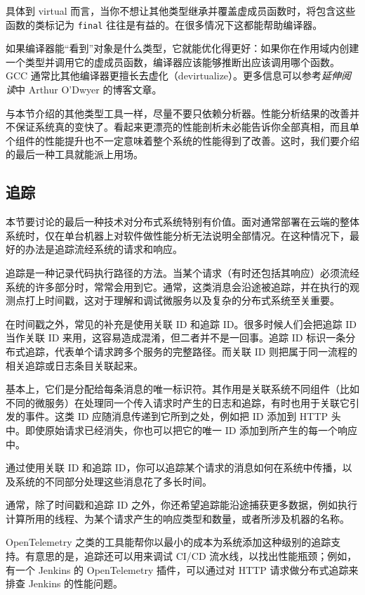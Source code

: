 具体到 virtual 而言，当你不想让其他类型继承并覆盖虚成员函数时，将包含这些函数的类标记为 \texttt{final} 往往是有益的。在很多情况下这都能帮助编译器。

\label{idx:1209}
如果编译器能“看到”对象是什么类型，它就能优化得更好：如果你在作用域内创建一个类型并调用它的虚成员函数，编译器应该能够推断出应该调用哪个函数。GCC 通常比其他编译器更擅长去虚化（devirtualize）。更多信息可以参考\emph{延伸阅读}中 Arthur O'Dwyer 的博客文章。

与本节介绍的其他类型工具一样，尽量不要只依赖分析器。性能分析结果的改善并不保证系统真的变快了。看起来更漂亮的性能剖析未必能告诉你全部真相，而且单个组件的性能提升也不一定意味着整个系统的性能得到了改善。这时，我们要介绍的最后一种工具就能派上用场。

\subsection{追踪}

\label{idx:1210}
本节要讨论的最后一种技术对分布式系统特别有价值。面对通常部署在云端的整体系统时，仅在单台机器上对软件做性能分析无法说明全部情况。在这种情况下，最好的办法是追踪流经系统的请求和响应。

追踪是一种记录代码执行路径的方法。当某个请求（有时还包括其响应）必须流经系统的许多部分时，常常会用到它。通常，这类消息会沿途被追踪，并在执行的观测点打上时间戳，这对于理解和调试微服务以及复杂的分布式系统至关重要。

在时间戳之外，常见的补充是使用关联 ID 和追踪 ID。很多时候人们会把追踪 ID 当作关联 ID 来用，这容易造成混淆，但二者并不是一回事。追踪 ID 标识一条分布式追踪，代表单个请求跨多个服务的完整路径。而关联 ID 则把属于同一流程的相关追踪或日志条目关联起来。

基本上，它们是分配给每条消息的唯一标识符。其作用是关联系统不同组件（比如不同的微服务）在处理同一个传入请求时产生的日志和追踪，有时也用于关联它引发的事件。这类 ID 应随消息传递到它所到之处，例如把 ID 添加到 HTTP 头中。即使原始请求已经消失，你也可以把它的唯一 ID 添加到所产生的每一个响应中。

通过使用关联 ID 和追踪 ID，你可以追踪某个请求的消息如何在系统中传播，以及系统的不同部分处理这些消息花了多长时间。

通常，除了时间戳和追踪 ID 之外，你还希望追踪能沿途捕获更多数据，例如执行计算所用的线程、为某个请求产生的响应类型和数量，或者所涉及机器的名称。

\label{idx:1211}
OpenTelemetry 之类的工具能帮你以最小的成本为系统添加这种级别的追踪支持。有意思的是，追踪还可以用来调试 CI/CD 流水线，以找出性能瓶颈；例如，有一个 Jenkins 的 OpenTelemetry 插件，可以通过对 HTTP 请求做分布式追踪来排查 Jenkins 的性能问题。

